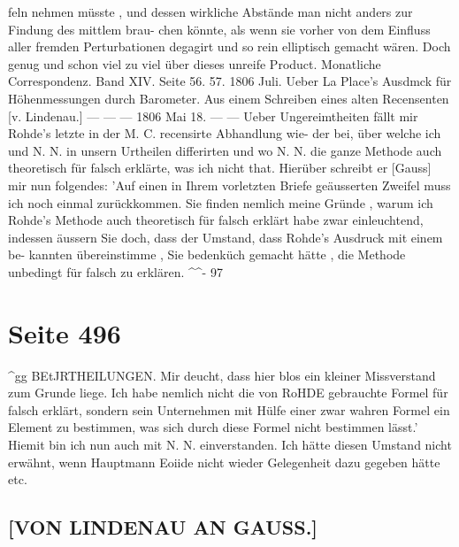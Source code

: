 \documentclass[10pt,a4paper]{article}
\begin{document}
feln nehmen  müsste ,  und  dessen  wirkliche  Abstände  man  nicht  anders  zur  Findung  des  mittlem  brau-
chen könnte,  als  wenn  sie  vorher  von  dem  Einfluss  aller  fremden  Perturbationen  degagirt  und  so  rein
elliptisch  gemacht  wären.    Doch  genug  und  schon  viel  zu  viel  über  dieses  unreife  Product.
Monatliche  Correspondenz.     Band  XIV.  Seite  56.  57.     1806  Juli.
Ueber  La  Place's  Ausdmck  für  Höhenmessungen  durch  Barometer.     Aus  einem  Schreiben  eines  alten
Recensenten  [v.  Lindenau.]
---     ---     ---     1806  Mai  18.
---  ---  Ueber  Ungereimtheiten  fällt  mir  Rohde's  letzte  in  der  M.  C.  recensirte  Abhandlung  wie-
der bei,  über  welche  ich  und  N.  N.  in  unsern  Urtheilen  differirten  und  wo  N.  N.  die  ganze  Methode
auch  theoretisch  für  falsch  erklärte,  was  ich  nicht  that.     Hierüber  schreibt  er  [Gauss]  mir  nun  folgendes:
'Auf  einen  in  Ihrem  vorletzten  Briefe  geäusserten  Zweifel  muss  ich  noch  einmal  zurückkommen.
Sie  finden  nemlich  meine  Gründe ,  warum  ich  Rohde's  Methode  auch  theoretisch  für  falsch  erklärt  habe
zwar  einleuchtend,  indessen  äussern  Sie  doch,  dass  der  Umstand,  dass  Rohde's  Ausdruck  mit  einem  be-
kannten übereinstimme ,    Sie  bedenküch  gemacht  hätte ,  die  Methode  unbedingt  für  falsch  zu  erklären.
\textasciicircum{}\textasciicircum{}-  97

\newpage
\section*{Seite 496}

\textasciicircum{}gg  BEtJRTHEILUNGEN.
Mir  deucht,  dass  hier  blos  ein  kleiner  Missverstand  zum  Grunde  liege.  Ich  habe  nemlich  nicht  die  von
RoHDE  gebrauchte  Formel  für  falsch  erklärt,  sondern  sein  Unternehmen  mit  Hülfe  einer  zwar  wahren
Formel  ein  Element  zu  bestimmen,  was  sich  durch  diese  Formel  nicht  bestimmen  lässt.'
Hiemit  bin  ich  nun  auch  mit  N.  N.  einverstanden.  Ich  hätte  diesen  Umstand  nicht  erwähnt,
wenn  Hauptmann  Eoiide  nicht  wieder  Gelegenheit  dazu  gegeben  hätte  etc.
\subsection*{[VON  LINDENAU  AN  GAUSS.]}
\end{document}
